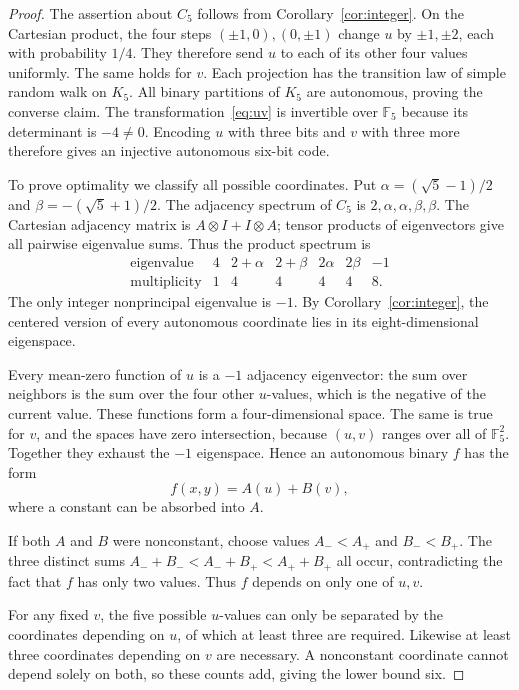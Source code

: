 \documentclass[11pt]{article}
\theoremstyle{definition}
\newcommand{\F}{\mathbb F}
\numberwithin{equation}{section}
\begin{document}
\begin{proof}
The assertion about $C_5$ follows from Corollary~\ref{cor:integer}.
On the Cartesian product, the four steps $(\pm1,0),(0,\pm1)$ change $u$
by $\pm1,\pm2$, each with probability $1/4$. They therefore send $u$ to
each of its other four values uniformly. The same holds for $v$. Each
projection has the transition law of simple random walk on $K_5$.
All binary partitions of $K_5$ are autonomous, proving the converse
claim. The transformation~\eqref{eq:uv} is invertible over $\F_5$ because
its determinant is $-4\ne0$. Encoding $u$ with three bits and $v$ with
three more therefore gives an injective autonomous six-bit code.

To prove optimality we classify all possible coordinates. Put
$\alpha=(\sqrt5-1)/2$ and $\beta=-(\sqrt5+1)/2$. The adjacency spectrum
of $C_5$ is $2,\alpha,\alpha,\beta,\beta$. The Cartesian adjacency
matrix is $A\otimes I+I\otimes A$; tensor products of eigenvectors give
all pairwise eigenvalue sums. Thus the product spectrum is
\[
 \begin{array}{c|rrrrrr}
 \text{eigenvalue}&4&2+\alpha&2+\beta&2\alpha&2\beta&-1\\
 \text{multiplicity}&1&4&4&4&4&8.
 \end{array}
\]
The only integer nonprincipal eigenvalue is $-1$. By
Corollary~\ref{cor:integer}, the centered version of every autonomous
coordinate lies in its eight-dimensional eigenspace.

Every mean-zero function of $u$ is a $-1$ adjacency eigenvector: the
sum over neighbors is the sum over the four other $u$-values, which is
the negative of the current value. These functions form a four-dimensional
space. The same is true for $v$, and the spaces have zero intersection,
because $(u,v)$ ranges over all of $\F_5^2$. Together they exhaust the
$-1$ eigenspace. Hence an autonomous binary $f$ has the form
\[
 f(x,y)=A(u)+B(v),
\]
where a constant can be absorbed into $A$.

If both $A$ and $B$ were nonconstant, choose values
$A_-<A_+$ and $B_-<B_+$. The three distinct sums
$A_-+B_-<A_-+B_+<A_++B_+$ all occur, contradicting the fact that $f$
has only two values. Thus $f$ depends on only one of $u,v$.

For any fixed $v$, the five possible $u$-values can only be separated by
the coordinates depending on $u$, of which at least three are required.
Likewise at least three coordinates depending on $v$ are necessary.
A nonconstant coordinate cannot depend solely on both, so these counts
add, giving the lower bound six.
\end{proof}
\end{document}
